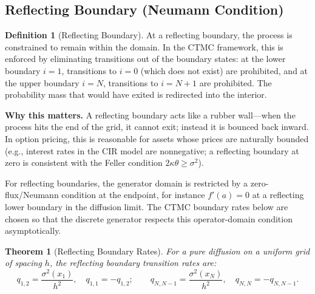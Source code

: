 \documentclass[11pt,a4paper,openany]{book}
\theoremstyle{definition}
\newtheorem{definition}{Definition}[chapter]
\theoremstyle{plain}
\newtheorem{theorem}{Theorem}[chapter]
\theoremstyle{remark}
\newcommand{\1}{\mathbbm{1}}
\begin{document}
\subsection{Reflecting Boundary (Neumann Condition)}

\begin{definition}[Reflecting Boundary]
At a reflecting boundary, the process is constrained to remain within the domain. In the CTMC framework, this is enforced by eliminating transitions out of the boundary states: at the lower boundary $i=1$, transitions to $i=0$ (which does not exist) are prohibited, and at the upper boundary $i=N$, transitions to $i=N+1$ are prohibited. The probability mass that would have exited is redirected into the interior.
\end{definition}

\medskip
\noindent\textbf{Why this matters.} A reflecting boundary acts like a rubber wall---when the process hits the end of the grid, it cannot exit; instead it is bounced back inward. In option pricing, this is reasonable for assets whose prices are naturally bounded (e.g., interest rates in the CIR model are nonnegative; a reflecting boundary at zero is consistent with the Feller condition $2\kappa\theta \geq \sigma^{2}$).

For reflecting boundaries, the generator domain is restricted by a zero-flux/Neumann condition at the endpoint, for instance $f'(a)=0$ at a reflecting lower boundary in the diffusion limit. The CTMC boundary rates below are chosen so that the discrete generator respects this operator-domain condition asymptotically.

\begin{theorem}[Reflecting Boundary Rates]
For a pure diffusion on a uniform grid of spacing $h$, the reflecting boundary transition rates are:
\[
\boxed{q_{1,2} = \frac{\sigma^{2}(x_{1})}{h^{2}}, \quad q_{1,1} = -q_{1,2}; \qquad
q_{N,N-1} = \frac{\sigma^{2}(x_{N})}{h^{2}}, \quad q_{N,N} = -q_{N,N-1}}.
\]
\end{theorem}
\end{document}
